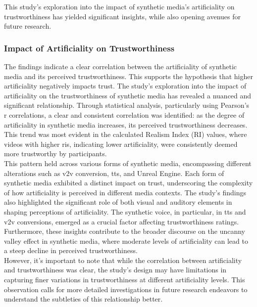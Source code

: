 \documentclass[
  a4paper,  %
  twoside,  %
  bibliography=totoc,
  headsepline,
  cleardoublepage=empty,
  parskip=half,
  draft=false
]{scrbook}
\begin{document}
This study's exploration into the impact of synthetic media's artificiality on trustworthiness has yielded significant insights, while also opening avenues for future research.

\subsubsection{Impact of Artificiality on Trustworthiness}
The findings indicate a clear correlation between the artificiality of synthetic media and its perceived trustworthiness. This supports the hypothesis that higher artificiality negatively impacts trust. The study's exploration into the impact of artificiality on the trustworthiness of synthetic media has revealed a nuanced and significant relationship. Through statistical analysis, particularly using Pearson's r correlations, a clear and consistent correlation was identified: as the degree of artificiality in synthetic media increases, its perceived trustworthiness decreases. This trend was most evident in the calculated Realism Index (RI) values, where videos with higher \gls{ri}s, indicating lower artificiality, were consistently deemed more trustworthy by participants. \\
This pattern held across various forms of synthetic media, encompassing different alterations such as \gls{v2v} conversion, \gls{tts}, and Unreal Engine. Each form of synthetic media exhibited a distinct impact on trust, underscoring the complexity of how artificiality is perceived in different media contexts. The study's findings also highlighted the significant role of both visual and auditory elements in shaping perceptions of artificiality. The synthetic voice, in particular, in \gls{tts} and \gls{v2v} conversions, emerged as a crucial factor affecting trustworthiness ratings. \\
Furthermore, these insights contribute to the broader discourse on the uncanny valley effect in synthetic media, where moderate levels of artificiality can lead to a steep decline in perceived trustworthiness. \\
However, it's important to note that while the correlation between artificiality and trustworthiness was clear, the study's design may have limitations in capturing finer variations in trustworthiness at different artificiality levels. This observation calls for more detailed investigations in future research endeavors to understand the subtleties of this relationship better.
\end{document}
